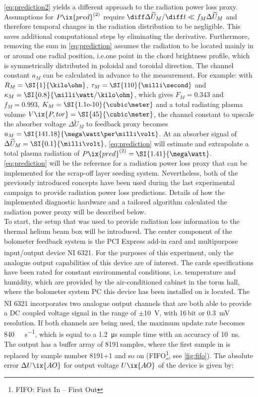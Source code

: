         \autoref{eq:prediction2} yields a different approach to the radiation power loss proxy. Assumptions for $P\ix{pred}^{\left(2\right)}$ require $\diff\Delta\widetilde{U}_{M}/\diff t\ll f_{M}\Delta\widetilde{U}_{M}$ and therefore temporal changes in the radiation distribution to be negligible. This saves additional computational steps by eliminating the derivative. Furthermore, removing the sum in \cref{eq:prediction} assumes the radiation to be located mainly in or around one radial position, i.e.one point in the chord brightness profile, which is symmetrically distributed in poloidal and toroidal direction. The channel constant $a_{M}$ can be calculated in advance to the measurement. For example: with $R_{M}=\text{\SI{1}{\kilo\ohm}}$, $\tau_{M}=\text{\SI{110}{\milli\second}}$ and $\kappa_{M}=\text{\SI{0.8}{\milli\watt/\kilo\ohm}}$, which gives $F_{M}=0.343$ and $f_{M}=0.993$, $K_{M}=\text{\SI{1.1e-10}{\cubic\meter}}$ and a total radiating plasma volume $V\ix{P, tor}=\text{\SI{45}{\cubic\meter}}$, the channel constant to upscale the absorber voltage $\Delta\widetilde{U}_{M}$ to feedback proxy becomes $a_{M}=\text{\SI{141.18}{\mega\watt\per\milli\volt}}$. At an absorber signal of $\Delta\widetilde{U}_{M}=\text{\SI{0.1}{\milli\volt}}$, \cref{eq:prediction} will estimate and extrapolate a total plasma radiation of $P\ix{pred}^{\left(2\right)}=\text{\SI{1.41}{\mega\watt}}$.\\%
        \autoref{eq:prediction} will be the reference for a radiation power loss proxy that can be implemented for the scrap-off layer seeding system. Nevertheless, both of the previously introduced concepts have been used during the last experimental campaign to provide radiation power loss predictions. Details of how the implemented diagnostic hardware and a tailored algorithm calculated the radiation power proxy will be described below.\\%
        To start, the setup that was used to provide radiation loss information to the thermal helium beam box will be introduced. The center component of the bolometer feedback system is the PCI Express add-in card and multipurpose input/output device NI\textsuperscript{\textregistered} 6321. For the purposes of this experiment, only the analogue output capabilities of this device are of interest. The cards specifications have been rated for constant environmental conditions, i.e. temperature and humidity, which are provided by the air-conditioned cabinet in the torus hall, where the bolometer system PC this device has been installed on is located. The NI\textsuperscript{\textregistered} 6321 incorporates two analogue output channels that are both able to provide a DC coupled voltage signal in the range of $\pm$\SI{10}{\volt}, with 16$\,$bit or \SI{0.3}{\milli\volt} resolution. If both channels are being used, the maximum update rate becomes \SI{840}{\kilo\sample\per\second}, which is equal to a \SI{1.2}{\micro\second} sample time with an accuracy of \SI{10}{\nano\second}. The output has a buffer array of 8191$\,$samples, where the first sample in is replaced by sample number 8191+1 and so on (FIFO\footnote[1]{FIFO: First In – First Out}, see \cref{fig:fifo}). The absolute error $\Delta U\ix{AO}$ for output voltage $U\ix{AO}$ of the device is given by:%
